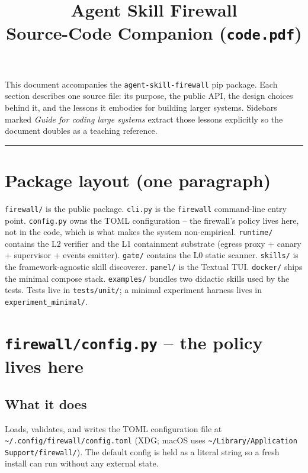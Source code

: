 \documentclass[11pt,a4paper]{article}
\title{\bfseries Agent Skill Firewall \\ \large Source-Code Companion (\texttt{code.pdf})}
\author{}
\date{}
\begin{document}
\maketitle

\noindent
This document accompanies the \texttt{agent-skill-firewall} pip package. Each
section describes one source file: its purpose, the public API, the design
choices behind it, and the lessons it embodies for building larger
systems. Sidebars marked \emph{Guide for coding large systems} extract
those lessons explicitly so the document doubles as a teaching reference.

\tableofcontents
\bigskip\hrule\bigskip

\section{Package layout (one paragraph)}

\noindent\texttt{firewall/} is the public package. \texttt{cli.py} is the
\texttt{firewall} command-line entry point. \texttt{config.py} owns the
TOML configuration -- the firewall's policy lives here, not in the code,
which is what makes the system non-empirical. \texttt{runtime/} contains
the L2 verifier and the L1 containment substrate (egress proxy + canary
+ supervisor + events emitter). \texttt{gate/} contains the L0 static
scanner. \texttt{skills/} is the framework-agnostic skill discoverer.
\texttt{panel/} is the Textual TUI. \texttt{docker/} ships the minimal
compose stack. \texttt{examples/} bundles two didactic skills used by
the tests. Tests live in \texttt{tests/unit/}; a minimal experiment
harness lives in \texttt{experiment\_minimal/}.

\section{\texttt{firewall/config.py} -- the policy lives here}

\subsection{What it does}
Loads, validates, and writes the TOML configuration file at
\texttt{\textasciitilde/.config/firewall/config.toml} (XDG; macOS uses
\texttt{\textasciitilde/Library/Application Support/firewall/}). The
default config is held as a literal string so a fresh install can run
without any external state.
\end{document}
